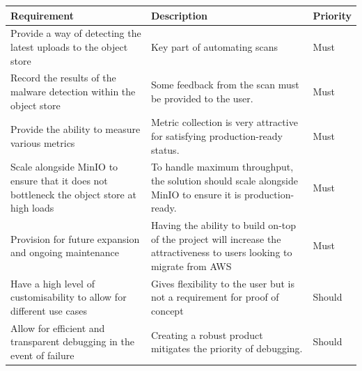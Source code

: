 \documentclass[12pt, conference, final, a4paper, onecolumn, compsoc]{IEEEtran}
\begin{document}
\begin{table}[H] \centering
  \begin{tabular}{|p{}|p{}|l|} \hline
    \textbf{Requirement} & \textbf{Description} & \textbf{Priority} \\ \hline
    Provide a way of detecting the latest uploads to the object store & Key part
    of automating scans & Must \\ \hline Record the results of the malware
    detection within the object store & Some feedback from the scan must be
    provided to the user. & Must \\ \hline Provide the ability to measure
    various metrics & Metric
                      collection is very attractive for satisfying production-ready status. & Must \\
    \hline Scale alongside MinIO to ensure that it does not bottleneck the
    object store at high loads & To handle maximum throughput, the solution
                                 should scale alongside MinIO to ensure it is
                                 production-ready. & Must \\ \hline Provision
    for future expansion and ongoing maintenance & Having the ability to build
                                                   on-top of the project will
                                                   increase the attractiveness
                                                   to users looking to migrate
                                                   from AWS & Must \\ \hline
    \hline

    Have a high level of customisability to allow for different use cases &
                                                                            Gives flexibility to the user but is not a requirement for proof of concept &
                                                                                                                                                          Should \\ \hline Allow for efficient and transparent debugging in the event of
    failure & Creating a robust product mitigates the priority of debugging. &
                                                                               Should \\ \hline


\end{tabular}
\end{table}
\end{document}

